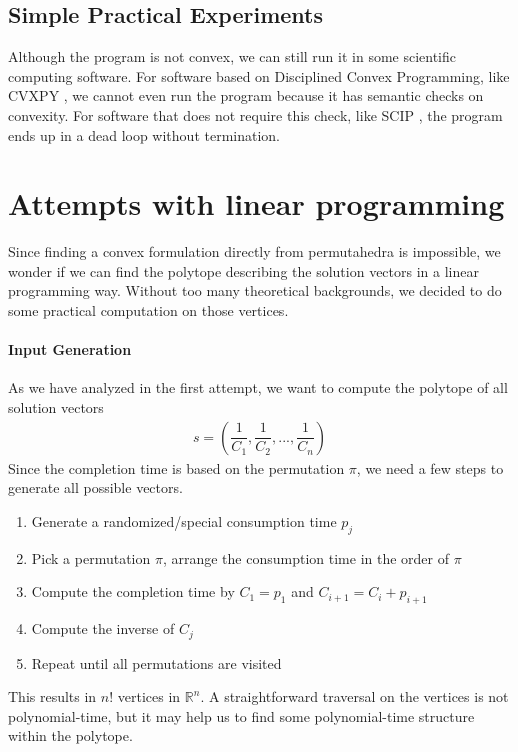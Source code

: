 \documentclass[12pt,letterpaper]{article}
\newcommand*{\R}{\mathbb{R}}
\begin{document}
\subsection{Simple Practical Experiments}
Although the program is not convex, we can still run it in some scientific computing software.
For software based on Disciplined Convex Programming, like CVXPY \cite{diamond2016cvxpy}, we cannot even run the program 
because it has semantic checks on convexity. For software that does not require this check, like SCIP \cite{BolusaniEtal2024ZR}, the program 
ends up in a dead loop without termination. 

\section{Attempts with linear programming}
Since finding a convex formulation directly from permutahedra is impossible, 
we wonder if we can find the polytope describing the solution vectors in a linear programming way.
Without too many theoretical backgrounds, we decided to do some practical computation on those vertices.

\paragraph{Input Generation}
As we have analyzed in the first attempt, we want to compute the polytope of all solution vectors 
\begin{align*}
 s = \left( \dfrac{1}{C_1}, \dfrac{1}{C_2}, ..., \dfrac{1}{C_n} \right)
\end{align*}
Since the completion time is based on the permutation $\pi$, we need a few steps to generate all possible 
vectors. 
\begin{enumerate}
    \item Generate a randomized/special consumption time $p_j$
    \item Pick a permutation $\pi$, arrange the consumption time in the order of $\pi$
    \item Compute the completion time by $C_1 = p_1$ and $C_{i+1} = C_i + p_{i+1}$
    \item Compute the inverse of $C_j$
    \item Repeat until all permutations are visited
\end{enumerate}
This results in $n!$ vertices in $\R^n$. A straightforward traversal on the vertices is not 
polynomial-time, but it may help us to find some polynomial-time structure within the polytope.
\end{document}
